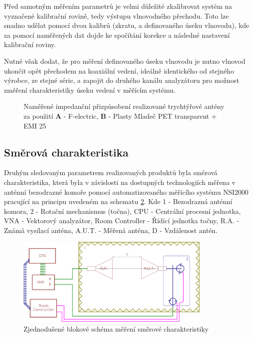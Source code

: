 Před samotným měřením parametrů je velmi důležité zkalibrovat systém na vyznačené kalibrační rovině, tedy výstupu vlnovodného přechodu. Toto lze snadno udělat pomocí dvou kalibrů (zkratu, a definovaného úseku vlnovodu), kde za pomocí naměřených dat dojde ke spočítání korekce a následné nastavení kalibrační roviny.

Nutné však dodat, že pro měření definovaného úseku vlnovodu je nutno vlnovod ukončit opět přechodem na koaxiální vedení, ideálně identického od stejného výrobce, ze stejné série, a zapojit do druhého kanálu analyzátoru pro možnost změření charakteristiky úseku vedení v měřícím systému. 

\begin{figure}
\caption{Naměřené impedanční přizpůsobení realizované trychtýřové antény za použití \textbf{A} - F-electric, \textbf{B} - Plasty Mladeč PET transparent + EMI 25}
\label{fig:Matching}
\end{figure}

\subsection{Směrová charakteristika}
Druhým sledovaným parametrem realizovaných produktů byla směrová charakteristika, která byla v závislosti na dostupných technologiích měřena v anténní bezodrazné komoře pomocí automatizovaného měřícího systému NSI2000 pracující na principu uvedeném na schematu \ref{fig:DirectDia}. Kde 1 - Bezodrazná anténní komora, 2 - Rotační mechanismus (točna), CPU - Centrální procesní jednotka, VNA - Vektorový analyzátor, Room Controller - Řídící jednotka točny, R.A. - Známá vysílací anténa, A.U.T. - Měřená anténa, D - Vzdálenost antén.

\begin{figure}[h]
\begin{center}
\includegraphics[width=9.5cm]{pics/DirectDia}
\caption{Zjednodušené blokové schéma měření směrové charakteristiky}
\label{fig:DirectDia}
\end{center}
\end{figure}


